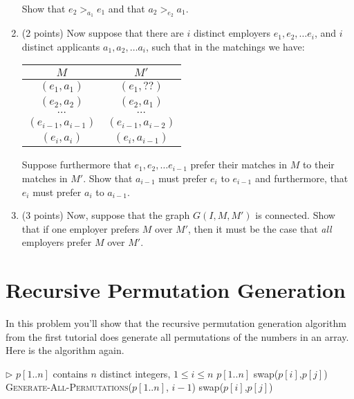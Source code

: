 \documentclass[11pt]{article}
\begin{document}
\begin{enumerate}
\vspace{.1in}

Show that $e_2 >_{a_1} e_1$ and that $a_2 >_{e_2} a_1$.

\item (2 points)
Now suppose that there are $i$ distinct employers $e_1,e_2,\ldots e_i$, and $i$ distinct applicants $a_1, a_2,\ldots a_i$, such that in the matchings we have:

  \vspace{.1in}

\begin{center}
\begin{tabular}{c|c}
$M$ & $M'$ \\ \hline
$(e_1,a_1)$ &  $(e_1, ??)$ \\
$(e_2,a_2)$ & $(e_2,a_1)$ \\
$\ldots$ & $\ldots$ \\
$(e_{i-1},a_{i-1})$ & $(e_{i-1},a_{i-2})$ \\[.1in]
$(e_i,a_i)$ & $(e_i,a_{i-1})$ \\
\end{tabular}
\end{center}
\vspace{.1in}

Suppose furthermore that $e_1, e_2, \ldots e_{i-1}$ prefer their
matches in $M$ to their matches in $M'$.
Show that $a_{i-1}$ must prefer $e_i$ to $e_{i-1}$
and furthermore, that $e_i$ must prefer $a_i$ to $a_{i-1}$.

\item (3 points)
Now, suppose that the graph $G(I,M,M')$ is connected. 
Show that if one employer prefers $M$ over $M'$, then it must be the case that {\em all} employers prefer $M$ over $M'$.

\end{enumerate}

\newpage

\section{Recursive Permutation Generation}
In this problem you'll show that 
the recursive permutation generation algorithm from the first tutorial does
generate all permutations of the numbers in an array. Here is the algorithm again.

\vspace{.1in}

\begin{algorithmic}[1]
\State $\triangleright$ $p[1..n]$ contains $n$ distinct integers, $1 \le i \le n$
\State \Return $p[1..n]$
\Else
      \State swap($p[i]$,$p[j]$)
      \State \textsc{Generate-All-Permutations}($p[1..n]$, $i-1$)
      \State swap($p[i]$,$p[j]$)
   \EndFor
\EndIf
\EndFunction
\end{algorithmic}
\end{document}
